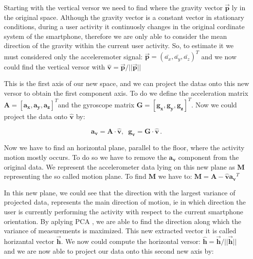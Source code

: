 Starting with the vertical versor we need to find where the gravity vector $\boldsymbol{\vec{p}}$ ly in the original space. Although the gravity vector is a constant vector in stationary conditions, during a user activity it continuosly changes in the original cordinate system of the smartphone, therefore we are only able to consider the mean direction of the gravity within the current user activity. So, to estimate it we must considered only the acceleremoter signal: \mbox{$ \boldsymbol{\vec{p}} = (\bar{a_{x}}, \bar{a_{y}}, \bar{a_{z}})^{T}$}  and we now could find the vertical versor with \mbox{$ \boldsymbol{\hat{v}} = \boldsymbol{\vec{p}} / ||\boldsymbol{\vec{p}}|| $}

This is the first axis of our new space, and we can project the datas onto this new versor to obtain the first component axis. To do we define the acceleration matrix \mbox{$\boldsymbol{A} = [ \boldsymbol{a_{x}}, \boldsymbol{a_{y}}, \boldsymbol{a_{z}} ]^{T}$}and the gyroscope matrix \mbox{$\boldsymbol{G} = [ \boldsymbol{g_{x}}, \boldsymbol{g_{y}}, \boldsymbol{g_{z}} ]^{T} $}. Now we could project the data onto $\boldsymbol{\hat{v}}$ by:

\begin{equation}
	\label{v-axis eq}
	 \boldsymbol{a_{v}} = \boldsymbol{A} \cdot \boldsymbol{\hat{v}} ,\;\; \boldsymbol{g_{v}} = \boldsymbol{G} \cdot \boldsymbol{\hat{v}} \,.
\end{equation} 

Now we have to find an horizontal plane, parallel to the floor, where the activity motion mostly occurs. To do so we have to remove the  $\boldsymbol{a_{v}}$ component from the original data. We represent the accelerometer data lying on this new plane as $\boldsymbol{M}$ representing the so called motion plane. To find $\boldsymbol{M}$ we have to: \mbox{$\boldsymbol{M} = \boldsymbol{A} - \boldsymbol{\hat{v}} \boldsymbol{a_{v}}^{T} $}

In this new plane, we could see that the direction with the largest variance of projected data, represents the main direction of motion, ie in which direction the user is currently performing the activity with respect to the current smartphone orientation. By aplying PCA \cite{rao1964use}, we are able to find the direction along which the variance of measurements is maximized. This new extracted vector it is called horizantal vector $\boldsymbol{\vec{h}}$. We now could compute the horizontal versor: \mbox{$ \boldsymbol{\hat{h}} = \boldsymbol{\vec{h}} / ||\boldsymbol{\vec{h}}|| $} and we are now able to project our data onto this second new axis by:

